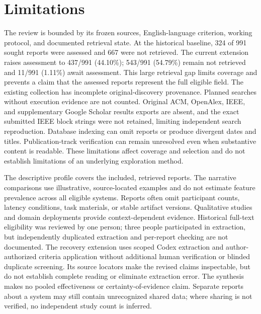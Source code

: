 \documentclass[manuscript,review,screen]{acmart}
\begin{document}
\section{Limitations}
The review is bounded by its frozen sources, English-language criterion, working protocol, and documented retrieval state. At the historical baseline, 324 of 991 sought reports were assessed and 667 were not retrieved. The current extension raises assessment to 437/991 (44.10\%); 543/991 (54.79\%) remain not retrieved and 11/991 (1.11\%) await assessment. This large retrieval gap limits coverage and prevents a claim that the assessed reports represent the full eligible field. The existing collection has incomplete original-discovery provenance. Planned searches without execution evidence are not counted. Original ACM, OpenAlex, IEEE, and supplementary Google Scholar results exports are absent, and the exact submitted IEEE block strings were not retained, limiting independent search reproduction. Database indexing can omit reports or produce divergent dates and titles. Publication-track verification can remain unresolved even when substantive content is readable. These limitations affect coverage and selection and do not establish limitations of an underlying exploration method.

The descriptive profile covers the included, retrieved reports. The narrative comparisons use illustrative, source-located examples and do not estimate feature prevalence across all eligible systems. Reports often omit participant counts, latency conditions, task materials, or stable artifact versions. Qualitative studies and domain deployments provide context-dependent evidence. Historical full-text eligibility was reviewed by one person; three people participated in extraction, but independently duplicated extraction and per-report checking are not documented. The recovery extension uses scoped Codex extraction and author-authorized criteria application without additional human verification or blinded duplicate screening. Its source locators make the revised claims inspectable, but do not establish complete reading or eliminate extraction error. The synthesis makes no pooled effectiveness or certainty-of-evidence claim. Separate reports about a system may still contain unrecognized shared data; where sharing is not verified, no independent study count is inferred.
\end{document}
